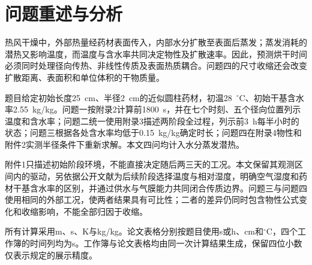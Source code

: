 \section{问题重述与分析}
热风干燥中，外部热量经药材表面传入，内部水分扩散至表面后蒸发；蒸发消耗的潜热又影响温度，而温度与含水率共同决定物性及扩散速率。因此，预测烘干时间必须同时处理径向传热、非线性传质及表面热质耦合。问题四的尺寸收缩还会改变扩散距离、表面积和单位体积的干物质量。

题目给定初始长度25~cm、半径2~cm的近似圆柱药材，初温28~$^\circ$C、初始干基含水率2.55~kg/kg。问题一按附录2计算前1800~s，并在七个时刻、五个径向位置列示温度和含水率；问题二统一使用附录3描述两阶段全过程，列示前3~h每半小时的状态；问题三根据各处含水率均低于0.15~kg/kg确定时长；问题四在附录4物性和附件2实测半径条件下重新求解\cite{problem}。本文四问均计入水分蒸发潜热。

附件1只描述初始阶段环境，不能直接决定随后两三天的工况。本文保留其观测区间内的驱动，另依据公开文献为后续阶段选择温度与相对湿度，明确空气湿度和药材干基含水率的区别，并通过供水与气膜能力共同闭合传质边界。问题三与问题四使用相同的外部工况，使两者结果具有可比性；二者的差异仍同时包含物性公式变化和收缩影响，不能全部归因于收缩。

所有计算采用m、s、K与kg/kg。论文表格分别按题目使用s或h、cm和$^\circ$C，四个工作簿的时间列均为s。工作簿与论文表格均由同一次计算结果生成，保留四位小数仅表示规定的展示精度。
